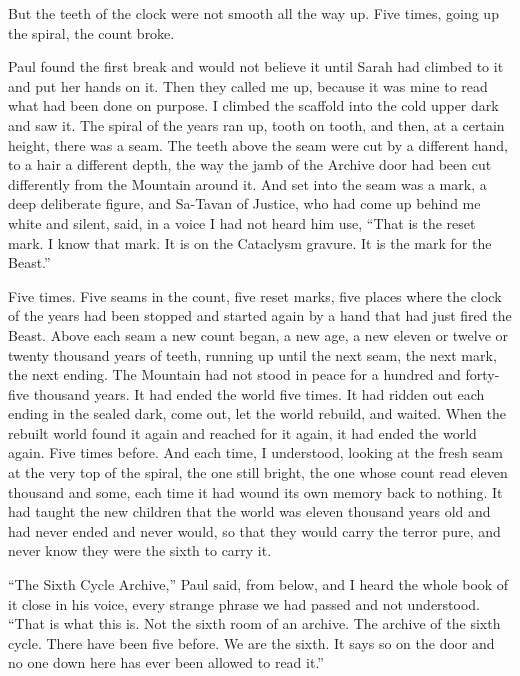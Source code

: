 \ornament

But the teeth of the clock were not smooth all the way up. Five times, going up the spiral, the count broke.\par

Paul found the first break and would not believe it until Sarah had climbed to it and put her hands on it. Then they called me up, because it was mine to read what had been done on purpose. I climbed the scaffold into the cold upper dark and saw it. The spiral of the years ran up, tooth on tooth, and then, at a certain height, there was a seam. The teeth above the seam were cut by a different hand, to a hair a different depth, the way the jamb of the Archive door had been cut differently from the Mountain around it. And set into the seam was a mark, a deep deliberate figure, and Sa-Tavan of Justice, who had come up behind me white and silent, said, in a voice I had not heard him use, ``That is the reset mark. I know that mark. It is on the Cataclysm gravure. It is the mark for the Beast.''\par

Five times. Five seams in the count, five reset marks, five places where the clock of the years had been stopped and started again by a hand that had just fired the Beast. Above each seam a new count began, a new age, a new eleven or twelve or twenty thousand years of teeth, running up until the next seam, the next mark, the next ending. The Mountain had not stood in peace for a hundred and forty-five thousand years. It had ended the world five times. It had ridden out each ending in the sealed dark, come out, let the world rebuild, and waited. When the rebuilt world found it again and reached for it again, it had ended the world again. Five times before. And each time, I understood, looking at the fresh seam at the very top of the spiral, the one still bright, the one whose count read eleven thousand and some, each time it had wound its own memory back to nothing. It had taught the new children that the world was eleven thousand years old and had never ended and never would, so that they would carry the terror pure, and never know they were the sixth to carry it.\par

``The Sixth Cycle Archive,'' Paul said, from below, and I heard the whole book of it close in his voice, every strange phrase we had passed and not understood. ``That is what this is. Not the sixth room of an archive. The archive of the sixth cycle. There have been five before. We are the sixth. It says so on the door and no one down here has ever been allowed to read it.''\par

